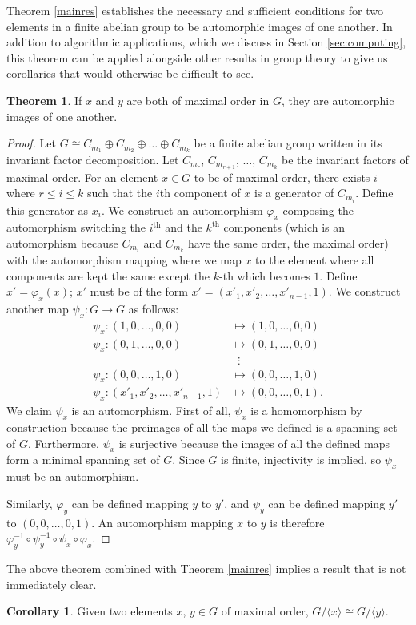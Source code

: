 \documentclass[11pt]{amsart}
\theoremstyle{definition}
\newtheorem{cor}[lem]{Corollary}
\newtheorem{thm}[lem]{Theorem}
\renewcommand{\phi}{\varphi}
\newcommand{\setx}{\langle x \rangle}
\newcommand{\sety}{\langle y \rangle}
\renewcommand{\leq}{\leqslant}
\numberwithin{equation}{section}
\begin{document}
Theorem \ref{mainres} establishes the necessary and sufficient conditions for two elements in a finite abelian group to be automorphic images of one another. In addition to algorithmic applications, which we discuss in Section \ref{sec:computing}, this theorem can be applied alongside other results in group theory to give us corollaries that would otherwise be difficult to see. 
\begin{thm}
If $x$ and $y$ are both of maximal order in $G$, they are automorphic images of one another. 
\end{thm}
\begin{proof}
Let $G \cong C_{m_1}\oplus C_{m_2} \oplus \dots \oplus C_{m_k}$ be a finite abelian group written in its invariant factor decomposition. Let $C_{m_r}$, $C_{m_{r+1}}$, $\dots$, $C_{m_k}$ be the invariant factors of maximal order. For an element $x \in G$ to be of maximal order, there exists $i$ where $r \leq i \leq k$ such that the $i$th component of $x$ is a generator of $C_{m_i}$. Define this generator as $x_i$. We construct an automorphism $\phi_{x}$ composing the automorphism switching the $i^\text{th}$ and the $k^\text{th}$ components (which is an automorphism because $C_{m_i}$ and $C_{m_k}$ have the same order, the maximal order) with the automorphism mapping where we map $x$ to the element where all components are kept the same except the $k$-th which becomes $1$. Define $x' = \phi_x(x)$; $x'$ must be of the form $x' = (x'_1, x'_2, \dots, x'_{n-1}, 1)$. We construct another map $\psi_x : G \rightarrow G$ as follows: \begin{align*}
\psi_x : (1, 0, \dots, 0, 0) &\mapsto (1, 0, \dots, 0, 0)\\
\psi_x : (0, 1, \dots, 0, 0) &\mapsto (0, 1, \dots, 0, 0)\\
&\;\;\vdots\\
\psi_x : (0, 0, \dots, 1, 0) &\mapsto (0, 0, \dots, 1, 0)\\
\psi_x : (x'_1, x'_2, \dots, x'_{n-1}, 1) &\mapsto (0, 0, \dots, 0, 1).
\end{align*}
We claim $\psi_x$ is an automorphism. First of all, $\psi_x$ is a homomorphism by construction because the preimages of all the maps we defined is a spanning set of $G$. Furthermore, $\psi_x$ is surjective because the images of all the defined maps form a minimal spanning set of $G$. Since $G$ is finite, injectivity is implied, so $\psi_x$ must be an automorphism. 

Similarly, $\phi_y$ can be defined mapping $y$ to $y'$, and $\psi_y$ can be defined mapping $y'$ to $(0, 0, \dots, 0, 1)$. An automorphism mapping $x$ to $y$ is therefore $\phi_y^{-1}\circ\psi_y^{-1}\circ\psi_x\circ\phi_x$. 
\end{proof}
The above theorem combined with Theorem \ref{mainres} implies a result that is not immediately clear. 
\begin{cor}
    Given two elements $x$, $y \in G$ of maximal order, $G/\setx \cong G/\sety$. 
\end{cor}
\end{document}
